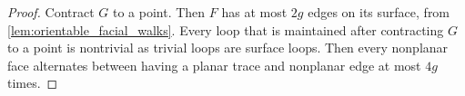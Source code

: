 \begin{proof}
	Contract \(G\) to a point. Then \(F\) has at most \(2g\) edges on its surface, from \cref{lem:orientable_facial_walks}. Every loop that is maintained after contracting $G$ to a point is nontrivial as trivial loops are surface loops.
	Then every nonplanar face alternates between having a planar trace and nonplanar edge at most \(4g\) times.
\end{proof}